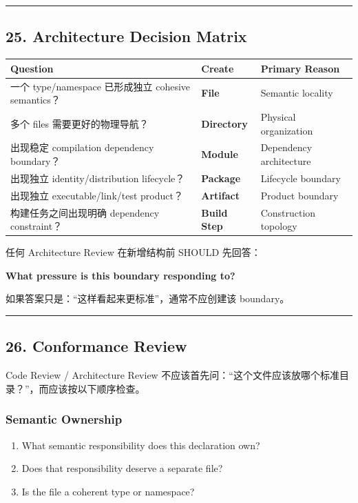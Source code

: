 \documentclass[11pt,a4paper]{article}
\begin{document}
\vspace{0.5em}\hrule\vspace{0.5em}
\subsection{25. Architecture Decision Matrix}
\begin{table}[htbp]
\centering
\small
\begin{tabularx}{\textwidth}{| X | X | X |}
\hline
\rowcolor{codebg}
\textbf{Question} & \textbf{Create} & \textbf{Primary Reason} \\ \hline
一个 type/namespace 已形成独立 cohesive semantics？ & \textbf{File} & Semantic locality \\ \hline
\rowcolor{codebg!50} 多个 files 需要更好的物理导航？ & \textbf{Directory} & Physical organization \\ \hline
出现稳定 compilation dependency boundary？ & \textbf{Module} & Dependency architecture \\ \hline
\rowcolor{codebg!50} 出现独立 identity/distribution lifecycle？ & \textbf{Package} & Lifecycle boundary \\ \hline
出现独立 executable/link/test product？ & \textbf{Artifact} & Product boundary \\ \hline
\rowcolor{codebg!50} 构建任务之间出现明确 dependency constraint？ & \textbf{Build Step} & Construction topology \\ \hline
\end{tabularx}
\end{table}
任何 Architecture Review 在新增结构前 SHOULD 先回答：

\begin{gfmBlockquote}
\textbf{What pressure is this boundary responding to?}
\end{gfmBlockquote}
如果答案只是：“这样看起来更标准”，通常不应创建该 boundary。

\vspace{0.5em}\hrule\vspace{0.5em}
\subsection{26. Conformance Review}
Code Review / Architecture Review 不应该首先问：“这个文件应该放哪个标准目录？”，而应该按以下顺序检查。

\subsubsection{Semantic Ownership}
\begin{enumerate}
  \item What semantic responsibility does this declaration own?
  \item Does that responsibility deserve a separate file?
  \item Is the file a coherent type or namespace?
\end{enumerate}
\end{document}
